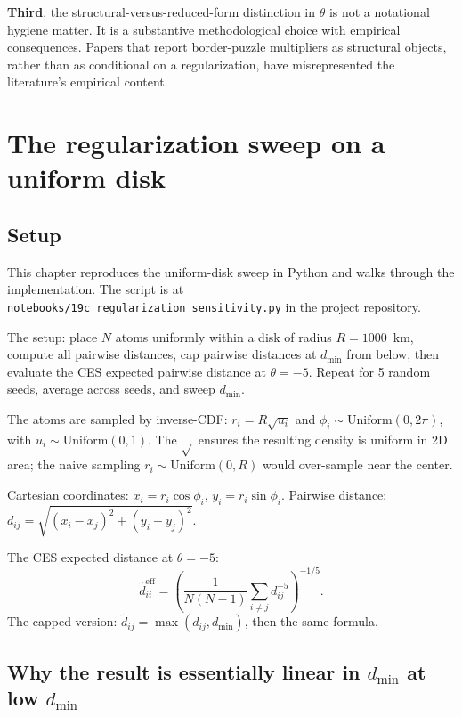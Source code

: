 \documentclass[11pt,letterpaper,oneside]{book}
\theoremstyle{definition}
\theoremstyle{remark}
\newcommand{\eff}{\mathrm{eff}}
\begin{document}
\textbf{Third}, the structural-versus-reduced-form distinction in
$\theta$ is not a notational hygiene matter. It is a substantive
methodological choice with empirical consequences. Papers that report
border-puzzle multipliers as structural objects, rather than as
conditional on a regularization, have misrepresented the literature's
empirical content.

\chapter{The regularization sweep on a uniform disk}
\label{ch:disk-sweep}

\section{Setup}

This chapter reproduces the uniform-disk sweep in Python and walks
through the implementation. The script is at
\texttt{notebooks/19c\_regularization\_sensitivity.py} in the project
repository.

The setup: place $N$ atoms uniformly within a disk of radius
$R = 1000$~km, compute all pairwise distances, cap pairwise distances at
$d_{\min}$ from below, then evaluate the CES expected pairwise distance
at $\theta = -5$. Repeat for 5 random seeds, average across seeds, and
sweep $d_{\min}$.

\begin{worked}
The atoms are sampled by inverse-CDF: $r_i = R \sqrt{u_i}$ and
$\phi_i \sim \mathrm{Uniform}(0, 2\pi)$, with $u_i \sim \mathrm{Uniform}(0, 1)$.
The $\sqrt{}$ ensures the resulting density is uniform in 2D area; the
naive sampling $r_i \sim \mathrm{Uniform}(0, R)$ would over-sample
near the center.

Cartesian coordinates: $x_i = r_i \cos \phi_i$, $y_i = r_i \sin \phi_i$.
Pairwise distance: $d_{ij} = \sqrt{(x_i - x_j)^2 + (y_i - y_j)^2}$.

The CES expected distance at $\theta = -5$:
$$\hat{d}_{ii}^{\eff} = \left( \frac{1}{N(N-1)} \sum_{i \neq j} d_{ij}^{-5} \right)^{-1/5}.$$
The capped version: $\tilde{d}_{ij} = \max(d_{ij}, d_{\min})$, then the
same formula.
\end{worked}

\section{Why the result is essentially linear in $d_{\min}$ at low $d_{\min}$}
\end{document}
